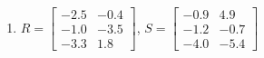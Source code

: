 \begin{exercise}
\begin{enumerate}
\item \(R=\begin{bmatrix} -2.5&-0.4
\\-1.0&-3.5
\\-3.3&1.8 \end{bmatrix}\),
\(S=\begin{bmatrix} -0.9&4.9
\\-1.2&-0.7
\\-4.0&-5.4 \end{bmatrix}\)


\end{enumerate}
\end{exercise}



